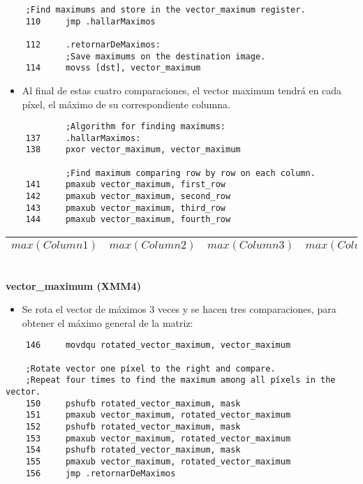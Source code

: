 \begin{codesnippet}
  \begin{verbatim}
	;Find maximums and store in the vector_maximum register.
	110		jmp .hallarMaximos

	112		.retornarDeMaximos:
			;Save maximums on the destination image.
	114		movss [dst], vector_maximum
  \end{verbatim}
\end{codesnippet}

\begin{itemize}
\item Al final de estas cuatro comparaciones, el vector maximum tendrá en cada píxel, el máximo de su correspondiente columna.
\end{itemize}

\begin{codesnippet}
  \begin{verbatim}
			;Algorithm for finding maximums:
	137		.hallarMaximos:
	138		pxor vector_maximum, vector_maximum

			;Find maximum comparing row by row on each column.
	141		pmaxub vector_maximum, first_row
	142		pmaxub vector_maximum, second_row
	143		pmaxub vector_maximum, third_row
	144		pmaxub vector_maximum, fourth_row
  \end{verbatim}
\end{codesnippet}

\begin{center}
  \begin{tabular}{|c || c || c || c |}
  \hline
  $max(Column1)$ & $max(Column2)$ & $max(Column3)$ & $max(Column4)$ \\ \hline
  \end{tabular}
  \\ \textbf{vector_maximum (XMM4)}
\end{center}

\begin{itemize}
\item Se rota el vector de máximos 3 veces y se hacen tres comparaciones, para obtener el máximo general de la matriz:
\end{itemize}

\begin{codesnippet}
  \begin{verbatim}
	146		movdqu rotated_vector_maximum, vector_maximum

	;Rotate vector one píxel to the right and compare.
	;Repeat four times to find the maximum among all píxels in the vector.
	150		pshufb rotated_vector_maximum, mask
	151		pmaxub vector_maximum, rotated_vector_maximum
	152		pshufb rotated_vector_maximum, mask
	153		pmaxub vector_maximum, rotated_vector_maximum
	154		pshufb rotated_vector_maximum, mask
	155		pmaxub vector_maximum, rotated_vector_maximum
	156		jmp .retornarDeMaximos
  \end{verbatim}
\end{codesnippet}

